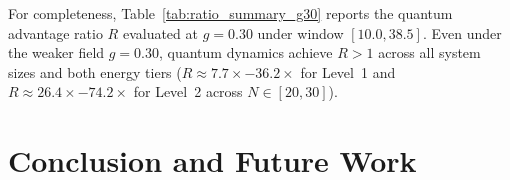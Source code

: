 \documentclass[12pt,a4paper]{report}
\begin{document}
For completeness, Table~\ref{tab:ratio_summary_g30} reports the quantum advantage ratio $R$ evaluated at $g = 0.30$ under window $[10.0, 38.5]$. Even under the weaker field $g = 0.30$, quantum dynamics achieve $R > 1$ across all system sizes and both energy tiers ($R \approx 7.7\times - 36.2\times$ for Level~1 and $R \approx 26.4\times - 74.2\times$ for Level~2 across $N \in [20, 30]$).

\begin{table}[htbp]
\centering
\small
\caption{Quantum advantage ratio $R = \langle P_< \rangle / r_{\mathrm{classical}}^*$ at $g = 0.30$ across system sizes $N \in \{20, \dots, 30\}$. Values report sample medians and $68\%$ bootstrap confidence intervals across symmetry-distinct traps for Level 1 (deepest traps) and Level 2 (first excited trap tier).}
\label{tab:ratio_summary_g30}
\end{table}

\chapter{Conclusion and Future Work}
\label{ch:conclusion}
\end{document}

